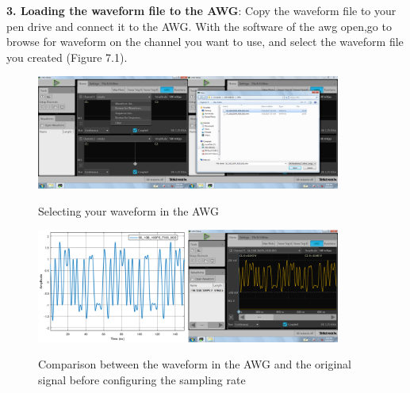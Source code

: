 \noindent
\textbf{3. Loading the waveform file to the AWG}:
Copy the waveform file to your pen drive and connect it to the AWG. With the software of the awg open,go to browse for waveform on the channel you want to use, and select the waveform file you created (Figure 7.1).

\begin{figure}[h]
	\centering
	\includegraphics[width=10cm]{../mtools/sgnToWfm/figures/tutorial1}
	\label{TUT_SelectingWFM}\caption{Selecting your waveform in the AWG}
\end{figure}
\begin{figure}[h]
	\centering
	\includegraphics[width=10cm]{../mtools/sgnToWfm/figures/tutorial2}
	\label{TUT_CompBad}\caption{Comparison between the waveform in the AWG and the original signal before configuring the sampling rate}
\end{figure}

